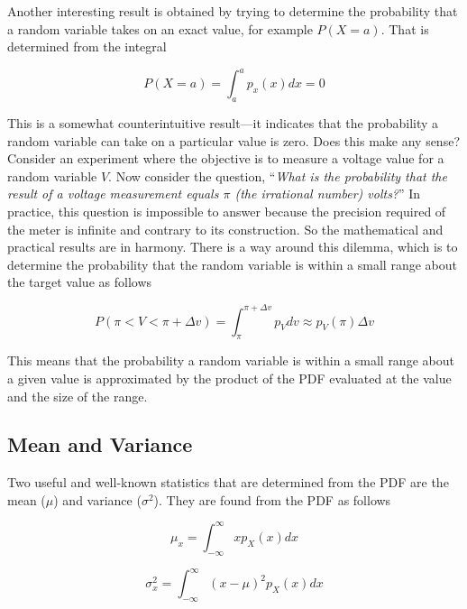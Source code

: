 {Another interesting result is obtained by trying to determine the
probability that a random variable takes on an exact value, for example
$P(X=a)$. That is determined from the
integral

\begin{equation}
\label{equ:integralSliceOfPDFequals0}
P(X=a) = \int^{a}_{a} p_x(x)dx = 0
\end{equation}

This is a somewhat counterintuitive result---it indicates that the
probability a random variable can take on a particular value is zero.
Does this make any sense? Consider an experiment where the objective is
to measure a voltage value for a random variable $V$. Now consider
the question, ``\emph{What is the probability that the result of a
voltage measurement equals $\pi$ (the irrational number) volts?}'' In
practice, this question is impossible to answer because the precision
required of the meter is infinite and contrary to its construction. So
the mathematical and practical results are in harmony. There is a way
around this dilemma, which is to determine the probability that the
random variable is within a small range about the target value as
follows

\begin{equation}
\label{equ:integralDeltaSliceOfPDF}
P(\pi < V < \pi+\Delta v) = \int^{\pi+\Delta v}_{\pi} p_V dv \approx p_V(\pi) \Delta v
\end{equation}

This means that the probability a random variable is within a small
range about a given value is approximated by the product of the PDF
evaluated at the value and the size of the range.

\subsection{Mean and Variance}
\label{subsection:mean-and-variance}

Two useful and well-known statistics that are determined from the PDF
are the mean ($\mu$) and variance ($\sigma^2$). 
They are found from the PDF as follows

\begin{equation}
\label{equ:systemReliabilityDefinitionMean}
\mu_x = \int^{\infty}_{-\infty}xp_X(x)dx
\end{equation}

\begin{equation}
\label{equ:systemReliabilityDefinitionDeviation}
\sigma^2_x = \int^{\infty}_{-\infty}(x-\mu)^2 p_X(x)dx
\end{equation}

}
